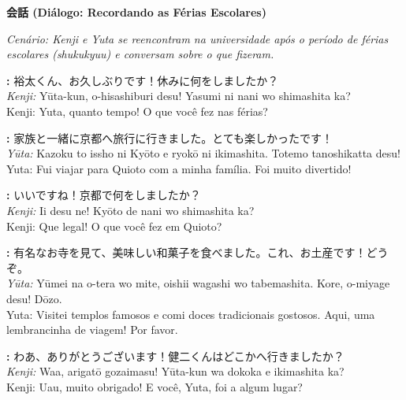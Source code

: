\documentclass[12pt,a4paper]{article}
\begin{document}
\newpage

\begin{center}
    {\LARGE\bfseries 会話 (Diálogo: Recordando as Férias Escolares)}
\end{center}

\textit{Cenário: Kenji e Yuta se reencontram na universidade após o período de férias escolares (\textit{shukukyuu}) e conversam sobre o que fizeram.}

\vspace{0.8em}

\textbf{:} 裕太くん、お久しぶりです！休みに何をしましたか？\\
\textit{Kenji:} Yūta-kun, o-hisashiburi desu! Yasumi ni nani wo shimashita ka?\\
Kenji: Yuta, quanto tempo! O que você fez nas férias?

\vspace{0.4em}

\textbf{:} 家族と一緒に京都へ旅行に行きました。とても楽しかったです！\\
\textit{Yūta:} Kazoku to issho ni Kyōto e ryokō ni ikimashita. Totemo tanoshikatta desu!\\
Yuta: Fui viajar para Quioto com a minha família. Foi muito divertido!

\vspace{0.4em}

\textbf{:} いいですね！京都で何をしましたか？\\
\textit{Kenji:} Ii desu ne! Kyōto de nani wo shimashita ka?\\
Kenji: Que legal! O que você fez em Quioto?

\vspace{0.4em}

\textbf{:} 有名なお寺を見て、美味しい和菓子を食べました。これ、お土産です！どうぞ。\\
\textit{Yūta:} Yūmei na o-tera wo mite, oishii wagashi wo tabemashita. Kore, o-miyage desu! Dōzo.\\
Yuta: Visitei templos famosos e comi doces tradicionais gostosos. Aqui, uma lembrancinha de viagem! Por favor.

\vspace{0.4em}

\textbf{:} わあ、ありがとうございます！健二くんはどこかへ行きましたか？\\
\textit{Kenji:} Waa, arigatō gozaimasu! Yūta-kun wa dokoka e ikimashita ka?\\
Kenji: Uau, muito obrigado! E você, Yuta, foi a algum lugar?
\end{document}
